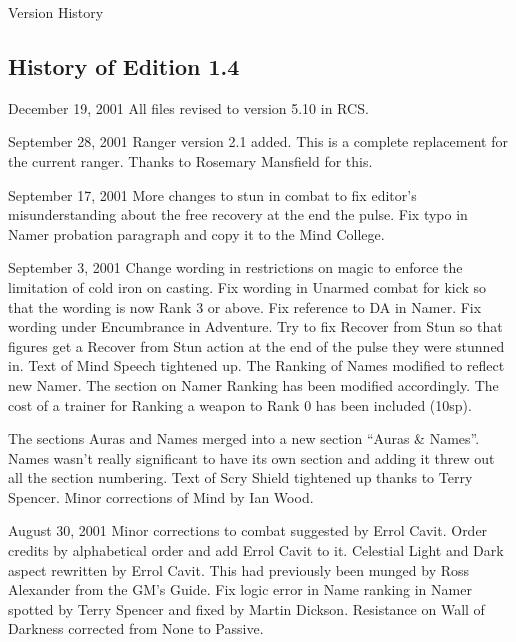 \begin{Chapter}{Version History}
\begin{Description}
\end{Description}

\subsection{History of Edition 1.4}

\begin{Description}

\item[December 19, 2001] All files revised to version 5.10 in RCS.

\item[September 28, 2001] Ranger version 2.1 added.  This is a
  complete replacement for the current ranger. Thanks to Rosemary
  Mansfield for this.

\item[September 17, 2001] More changes to stun in combat to fix
  editor’s misunderstanding about the free recovery at the end the
  pulse.  Fix typo in Namer probation paragraph and copy it to the
  Mind College.

\item[September 3, 2001] Change wording in restrictions on magic to
  enforce the limitation of cold iron on casting.  Fix wording in
  Unarmed combat for kick so that the wording is now Rank 3 or above.
  Fix reference to DA in Namer.  Fix wording under Encumbrance in
  Adventure.  Try to fix Recover from Stun so that figures get a
  Recover from Stun action at the end of the pulse they were stunned
  in.  Text of Mind Speech tightened up. The Ranking of Names modified
  to reflect new Namer. The section on Namer Ranking has been modified
  accordingly.  The cost of a trainer for Ranking a weapon to Rank 0
  has been included (10sp).

  The sections Auras and Names merged into a new section “Auras \&
  Names”.  Names wasn’t really significant to have its own section and
  adding it threw out all the section numbering.  Text of Scry Shield
  tightened up thanks to Terry Spencer. Minor corrections of Mind by
  Ian Wood.

\item[August 30, 2001] Minor corrections to combat suggested by Errol
  Cavit.  Order credits by alphabetical order and add Errol Cavit to
  it.  Celestial Light and Dark aspect rewritten by Errol Cavit.  This
  had previously been munged by Ross Alexander from the GM’s Guide.
  Fix logic error in Name ranking in Namer spotted by Terry Spencer
  and fixed by Martin Dickson.  Resistance on Wall of Darkness
  corrected from None to Passive.


\end{Description}
\end{Chapter}
